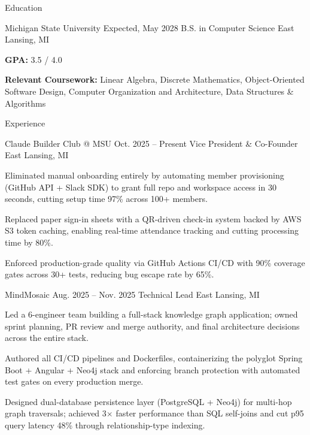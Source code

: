 \documentclass[
	11pt
]{../resume}
\begin{document}
	\begin{rSection}{E}{ducation}
		\begin{rSectionEntry}
			{Michigan State University}
			{Expected, May 2028}
			{B.S. in Computer Science}
			{}
			{East Lansing, MI}

			\item \textbf{GPA:} 3.5 / 4.0
			\item \textbf{Relevant Coursework:} Linear Algebra, Discrete Mathematics, Object-Oriented Software Design, Computer Organization and Architecture, Data Structures \& Algorithms
		\end{rSectionEntry}
	\end{rSection}

	\begin{rSection}{E}{xperience}
		\begin{rSectionEntry}
			{Claude Builder Club @ MSU}
			{Oct. 2025 -- Present}
			{Vice President \& Co-Founder}
			{}
			{East Lansing, MI}

			\item Eliminated manual onboarding entirely by automating member provisioning (GitHub API + Slack SDK) to grant full repo and workspace access in 30 seconds, cutting setup time 97\% across 100+ members.
			\item Replaced paper sign-in sheets with a QR-driven check-in system backed by AWS S3 token caching, enabling real-time attendance tracking and cutting processing time by 80\%.
			\item Enforced production-grade quality via GitHub Actions CI/CD with 90\% coverage gates across 30+ tests, reducing bug escape rate by 65\%.
		\end{rSectionEntry}

		\begin{rSectionEntry}
			{MindMosaic}
			{Aug. 2025 -- Nov. 2025}
			{Technical Lead}
			{}
			{East Lansing, MI}

			\item Led a 6-engineer team building a full-stack knowledge graph application; owned sprint planning, PR review and merge authority, and final architecture decisions across the entire stack.
			\item Authored all CI/CD pipelines and Dockerfiles, containerizing the polyglot Spring Boot + Angular + Neo4j stack and enforcing branch protection with automated test gates on every production merge.
			\item Designed dual-database persistence layer (PostgreSQL + Neo4j) for multi-hop graph traversals; achieved 3$\times$ faster performance than SQL self-joins and cut p95 query latency 48\% through relationship-type indexing.
		\end{rSectionEntry}
	\end{rSection}
\end{document}
